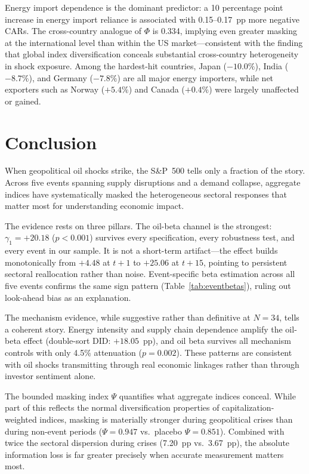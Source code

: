 \documentclass[12pt,preprint,authoryear]{elsarticle}
\begin{document}
Energy import dependence is the dominant predictor: a 10 percentage point increase in energy import reliance is associated with 0.15--0.17~pp more negative CARs. The cross-country analogue of $\Phi$ is 0.334, implying even greater masking at the international level than within the US market---consistent with the finding that global index diversification conceals substantial cross-country heterogeneity in shock exposure. Among the hardest-hit countries, Japan ($-10.0\%$), India ($-8.7\%$), and Germany ($-7.8\%$) are all major energy importers, while net exporters such as Norway ($+5.4\%$) and Canada ($+0.4\%$) were largely unaffected or gained.

\section{Conclusion}\label{sec:conclusion}
When geopolitical oil shocks strike, the S\&P~500 tells only a fraction of the story. Across five events spanning supply disruptions and a demand collapse, aggregate indices have systematically masked the heterogeneous sectoral responses that matter most for understanding economic impact.

The evidence rests on three pillars. The oil-beta channel is the strongest: $\gamma_1 = +20.18$ ($p < 0.001$) survives every specification, every robustness test, and every event in our sample. It is not a short-term artifact---the effect builds monotonically from $+4.48$ at $t+1$ to $+25.06$ at $t+15$, pointing to persistent sectoral reallocation rather than noise. Event-specific beta estimation across all five events confirms the same sign pattern (Table~\ref{tab:eventbetas}), ruling out look-ahead bias as an explanation.

The mechanism evidence, while suggestive rather than definitive at $N = 34$, tells a coherent story. Energy intensity and supply chain dependence amplify the oil-beta effect (double-sort DID: $+18.05$~pp), and oil beta survives all mechanism controls with only 4.5\% attenuation ($p = 0.002$). These patterns are consistent with oil shocks transmitting through real economic linkages rather than through investor sentiment alone.

The bounded masking index $\Psi$ quantifies what aggregate indices conceal. While part of this reflects the normal diversification properties of capitalization-weighted indices, masking is materially stronger during geopolitical crises than during non-event periods ($\Psi = 0.947$ vs.\ placebo $\Psi = 0.851$). Combined with twice the sectoral dispersion during crises (7.20~pp vs.\ 3.67~pp), the absolute information loss is far greater precisely when accurate measurement matters most.
\end{document}
